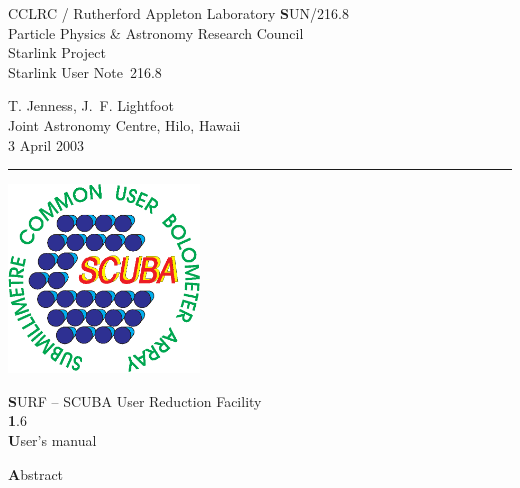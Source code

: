 \documentclass[twoside,11pt]{article}
\newcommand{\stardoccategory}  {Starlink User Note}
\newcommand{\stardocinitials}  {SUN}
\newcommand{\stardocnumber}    {216.8}
\newcommand{\stardocauthors}   {T. Jenness, J.~F. Lightfoot\\
                                Joint Astronomy Centre, Hilo, Hawaii}
\newcommand{\stardocdate}      {3 April 2003}
\newcommand{\stardoctitle}     {SURF -- SCUBA User Reduction Facility}
\newcommand{\stardocversion}   {1.6}
\newcommand{\stardocmanual}    {User's manual}
\newcommand{\stardocname}{\stardocinitials /\stardocnumber}
\newenvironment{latexonly}{}{}
\renewcommand{\_}{\texttt{\symbol{95}}}
\begin{document}
\thispagestyle{empty}



\begin{latexonly}
   CCLRC / {\textsc Rutherford Appleton Laboratory} \hfill {\textbf \stardocname}\\
   {\large Particle Physics \& Astronomy Research Council}\\
   {\large Starlink Project\\}
   {\large \stardoccategory\ \stardocnumber}
   \begin{flushright}
   \stardocauthors\\
   \stardocdate
   \end{flushright}
   \vspace{-4mm}
   \rule{\textwidth}{0.5mm}
   \vspace{5mm}
   \begin{center}
   \includegraphics[width=2.0in]{sun216_logo.eps}

   {\Huge\textbf  \stardoctitle \\ [2.5ex]}
   {\LARGE\textbf \stardocversion \\ [4ex]}
   {\Huge\textbf  \stardocmanual}
   \end{center}
   \vspace{5mm}


   \vspace{10mm}
   \begin{center}
      {\Large\textbf Abstract}
   \end{center}
\end{latexonly}
\end{document}
